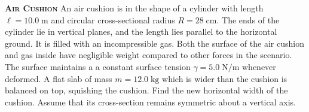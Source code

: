 \begin{problem}{\textbf{\textsc{Air Cushion}}}
An air cushion is in the shape of a cylinder with length $\ell=10.0\;\mathrm{m}$ and circular cross-sectional radius $R=28\;\mathrm{cm}$. The ends of the cylinder lie in vertical planes, and the length lies parallel to the horizontal ground. It is filled with an incompressible gas. Both the surface of the air cushion and gas inside have negligible weight compared to other forces in the scenario. The surface maintains a a constant surface tension $\gamma=5.0\;\mathrm{N/m}$ whenever deformed. A flat slab of mass $m=12.0\;\mathrm{kg}$ which is wider than the cushion is balanced on top, squishing the cushion. Find the new horizontal width of the cushion. Assume that its cross-section remains symmetric about a vertical axis.

\end{problem}